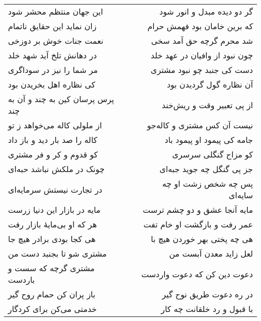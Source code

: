 \begin{center}
\begin{longtable}{l p{0.5cm} r}
\\
این جهان منتظم محشر شود
&&
گر دو دیده مبدل و انور شود
\\
زان نماید این حقایق ناتمام
&&
که برین خامان بود فهمش حرام
\\
نعمت جنات خوش بر دوزخی
&&
شد محرم گرچه حق آمد سخی
\\
در دهانش تلخ آید شهد خلد
&&
چون نبود از وافیان در عهد خلد
\\
مر شما را نیز در سوداگری
&&
دست کی جنبد چو نبود مشتری
\\
کی نظاره اهل بخریدن بود
&&
آن نظاره گول گردیدن بود
\\
پرس پرسان کین به چند و آن به چند
&&
از پی تعبیر وقت و ریش‌خند
\\
از ملولی کاله می‌خواهد ز تو
&&
نیست آن کس مشتری و کاله‌جو
\\
کاله را صد بار دید و باز داد
&&
جامه کی پیمود او پیمود باد
\\
کو قدوم و کر و فر مشتری
&&
کو مزاح گنگلی سرسری
\\
چونک در ملکش نباشد حبه‌ای
&&
جز پی گنگل چه جوید جبه‌ای
\\
در تجارت نیستش سرمایه‌ای
&&
پس چه شخص زشت او چه سایه‌ای
\\
مایه در بازار این دنیا زرست
&&
مایه آنجا عشق و دو چشم ترست
\\
هر که او بی‌مایهٔ بازار رفت
&&
عمر رفت و بازگشت او خام تفت
\\
هی کجا بودی برادر هیچ جا
&&
هی چه پختی بهر خوردن هیچ با
\\
مشتری شو تا بجنبد دست من
&&
لعل زاید معدن آبست من
\\
مشتری گرچه که سست و باردست
&&
دعوت دین کن که دعوت واردست
\\
باز پران کن حمام روح گیر
&&
در ره دعوت طریق نوح گیر
\\
خدمتی می‌کن برای کردگار
&&
با قبول و رد خلقانت چه کار
\\
\end{longtable}
\end{center}
